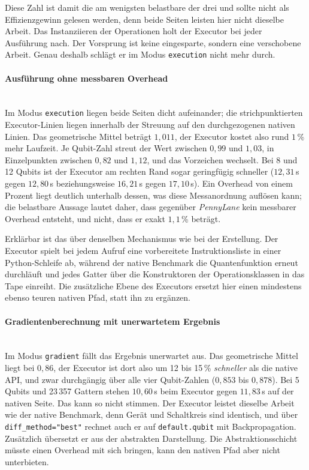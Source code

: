 Diese Zahl ist damit die am wenigsten belastbare der drei und sollte nicht als
Effizienzgewinn gelesen werden, denn beide Seiten leisten hier nicht dieselbe
Arbeit. Das Instanziieren der Operationen holt der Executor bei jeder Ausführung
nach. Der Vorsprung ist keine eingesparte, sondern eine verschobene Arbeit.
Genau deshalb schlägt er im Modus \texttt{execution} nicht mehr durch.

\paragraph*{Ausführung ohne messbaren Overhead}\mbox{}\\
Im Modus \texttt{execution} liegen beide Seiten dicht aufeinander; die
strichpunktierten Executor-Linien liegen innerhalb der Streuung auf den
durchgezogenen nativen Linien. Das geometrische Mittel beträgt $1{,}011$, der
Executor kostet also rund $1$\,\% mehr Laufzeit. Je Qubit-Zahl streut der Wert
zwischen $0{,}99$ und $1{,}03$, in Einzelpunkten zwischen $0{,}82$ und $1{,}12$,
und das Vorzeichen wechselt. Bei 8 und 12 Qubits ist der Executor am rechten
Rand sogar geringfügig schneller ($12{,}31$\,s gegen $12{,}80$\,s
beziehungsweise $16{,}21$\,s gegen $17{,}10$\,s). Ein Overhead von einem Prozent
liegt deutlich unterhalb dessen, was diese Messanordnung auflösen kann; die
belastbare Aussage lautet daher, dass gegenüber \textit{PennyLane} kein
messbarer Overhead entsteht, und nicht, dass er exakt $1{,}1$\,\% beträgt.

Erklärbar ist das über denselben Mechanismus wie bei der Erstellung. Der
Executor spielt bei jedem Aufruf eine vorbereitete Instruktionsliste in einer
Python-Schleife ab, während der native Benchmark die Quantenfunktion erneut
durchläuft und jedes Gatter über die Konstruktoren der Operationsklassen in das
Tape einreiht. Die zusätzliche Ebene des Executors ersetzt hier einen mindestens
ebenso teuren nativen Pfad, statt ihn zu ergänzen.

\paragraph*{Gradientenberechnung mit unerwartetem Ergebnis}\mbox{}\\
Im Modus \texttt{gradient} fällt das Ergebnis unerwartet aus. Das geometrische
Mittel liegt bei $0{,}86$, der Executor ist dort also um 12 bis 15\,\%
\emph{schneller} als die native API, und zwar durchgängig über alle vier
Qubit-Zahlen ($0{,}853$ bis $0{,}878$). Bei 5 Qubits und 23\,357 Gattern stehen
$10{,}60$\,s beim Executor gegen $11{,}83$\,s auf der nativen Seite. Das kann so
nicht stimmen. Der Executor leistet dieselbe Arbeit wie der native Benchmark,
denn Gerät und Schaltkreis sind identisch, und über \verb|diff_method="best"|
rechnet auch er auf \texttt{default.qubit} mit Backpropagation. Zusätzlich
übersetzt er aus der abstrakten Darstellung. Die Abstraktionsschicht müsste
einen Overhead mit sich bringen, kann den nativen Pfad aber nicht unterbieten.

